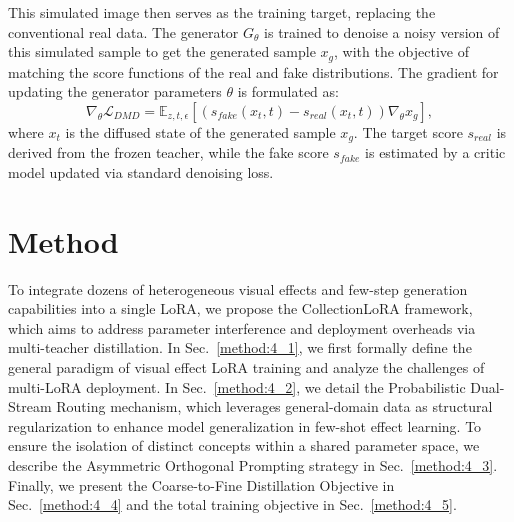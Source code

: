 \documentclass{llmxive}
\begin{document}
This simulated image then serves as the training target, replacing the conventional real data. The generator $G_\theta$ is trained to denoise a noisy version of this simulated sample to get the generated sample $x_g$, with the objective of matching the score functions of the real and fake distributions. The gradient for updating the generator parameters $\theta$ is formulated as:
\begin{equation}
    \label{eq: dmd}
    \nabla_\theta \mathcal{L}_{DMD} = \mathbb{E}_{z, t, \epsilon} \left[ \left( s_{fake}(x_t, t) - s_{real}(x_t, t) \right) \nabla_\theta x_g \right],
\end{equation}
where $x_t$ is the diffused state of the generated sample $x_g$. The target score $s_{real}$ is derived from the frozen teacher, while the fake score $s_{fake}$ is estimated by a critic model updated via standard denoising loss. 
\section{Method}
\label{sec:method}
To integrate dozens of heterogeneous visual effects and few-step generation capabilities into a single LoRA, we propose the CollectionLoRA framework, which aims to address parameter interference and deployment overheads via multi-teacher distillation. In Sec.~\ref{method:4_1}, we first formally define the general paradigm of visual effect LoRA training and analyze the challenges of multi-LoRA deployment. In Sec.~\ref{method:4_2}, we detail the Probabilistic Dual-Stream Routing mechanism, which leverages general-domain data as structural regularization to enhance model generalization in few-shot effect learning. To ensure the isolation of distinct concepts within a shared parameter space, we describe the Asymmetric Orthogonal Prompting  strategy in Sec.~\ref{method:4_3}. Finally, we present the Coarse-to-Fine Distillation Objective in Sec.~\ref{method:4_4} and the total training objective in Sec.~\ref{method:4_5}.
\end{document}
